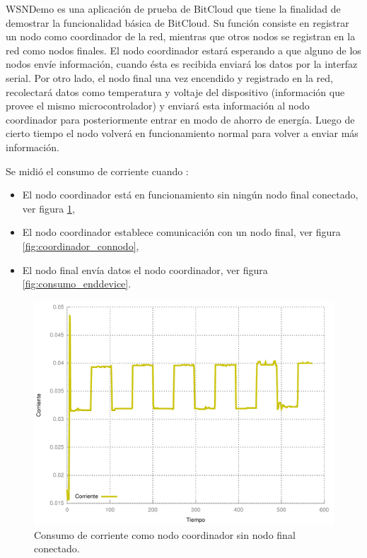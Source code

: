 WSNDemo es una aplicaci\'on de prueba de BitCloud que tiene la finalidad de demostrar la funcionalidad b\'asica de BitCloud. Su funci\'on consiste en registrar un nodo como coordinador de la red, mientras que otros nodos se registran en la red como nodos finales. El nodo coordinador estar\'a esperando a que alguno de los nodos env\'ie informaci\'on, cuando \'esta es recibida enviar\'a los datos por la interfaz serial. 
Por otro lado, el nodo final una vez encendido y registrado en la red, recolectar\'a datos como temperatura y voltaje del dispositivo (informaci\'on que provee el mismo microcontrolador) y enviar\'a esta informaci\'on al nodo coordinador para posteriormente entrar en modo de ahorro de energ\'ia. Luego de cierto tiempo el nodo volver\'a en funcionamiento normal para volver a enviar m\'as informaci\'on. 

Se midi\'o el consumo de corriente cuando : 

\begin{itemize}
\item El nodo coordinador est\'a en funcionamiento sin ning\'un nodo final conectado, ver figura \ref{fig:coordinador_sinnodo},
\item El nodo coordinador establece comunicaci\'on con un nodo final, ver figura \ref{fig:coordinador_connodo},
\item El nodo final env\'ia datos el nodo coordinador, ver figura \ref{fig:consumo_enddevice}.
\end{itemize}

\begin{figure}
	\centering
	\includegraphics[scale=0.5]{capitulo_4_imgs/corriente_sd_sinnodo.pdf}
	\caption{Consumo de corriente como nodo coordinador sin nodo final conectado.}
	\label{fig:coordinador_sinnodo}
\end{figure}

